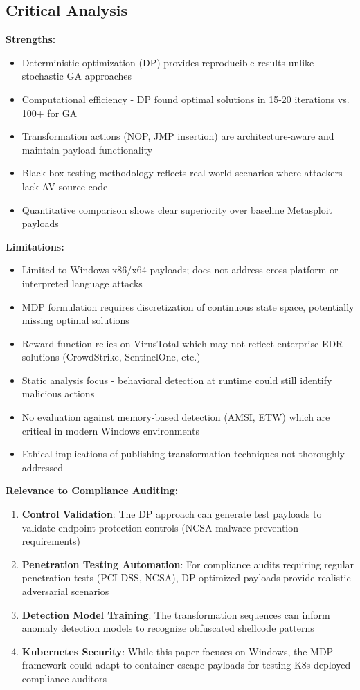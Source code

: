 \documentclass[11pt,conference]{IEEEtran}
\begin{document}
\subsection{Critical Analysis}

\textbf{Strengths:}
\begin{itemize}
    \item Deterministic optimization (DP) provides reproducible results unlike stochastic GA approaches
    \item Computational efficiency - DP found optimal solutions in 15-20 iterations vs. 100+ for GA
    \item Transformation actions (NOP, JMP insertion) are architecture-aware and maintain payload functionality
    \item Black-box testing methodology reflects real-world scenarios where attackers lack AV source code
    \item Quantitative comparison shows clear superiority over baseline Metasploit payloads
\end{itemize}

\textbf{Limitations:}
\begin{itemize}
    \item Limited to Windows x86/x64 payloads; does not address cross-platform or interpreted language attacks
    \item MDP formulation requires discretization of continuous state space, potentially missing optimal solutions
    \item Reward function relies on VirusTotal which may not reflect enterprise EDR solutions (CrowdStrike, SentinelOne, etc.)
    \item Static analysis focus - behavioral detection at runtime could still identify malicious actions
    \item No evaluation against memory-based detection (AMSI, ETW) which are critical in modern Windows environments
    \item Ethical implications of publishing transformation techniques not thoroughly addressed
\end{itemize}

\textbf{Relevance to Compliance Auditing:}

\begin{enumerate}
    \item \textbf{Control Validation}: The DP approach can generate test payloads to validate endpoint protection controls (NCSA malware prevention requirements)
    \item \textbf{Penetration Testing Automation}: For compliance audits requiring regular penetration tests (PCI-DSS, NCSA), DP-optimized payloads provide realistic adversarial scenarios
    \item \textbf{Detection Model Training}: The transformation sequences can inform anomaly detection models to recognize obfuscated shellcode patterns
    \item \textbf{Kubernetes Security}: While this paper focuses on Windows, the MDP framework could adapt to container escape payloads for testing K8s-deployed compliance auditors
\end{enumerate}
\end{document}
